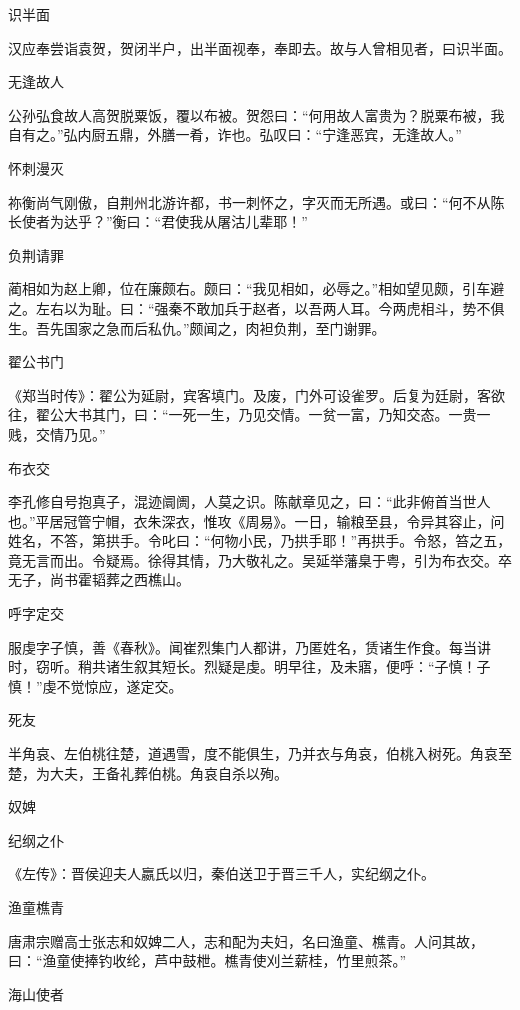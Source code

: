 \documentclass[a4paper,12pt,UTF8,twoside]{ctexbook}
\begin{document}
    识半面
    
    汉应奉尝诣袁贺，贺闭半户，出半面视奉，奉即去。故与人曾相见者，曰识半面。
    
    无逢故人
    
    公孙弘食故人高贺脱粟饭，覆以布被。贺怨曰：“何用故人富贵为？脱粟布被，我自有之。”弘内厨五鼎，外膳一肴，诈也。弘叹曰：“宁逢恶宾，无逢故人。”
    
    怀刺漫灭
    
    祢衡尚气刚傲，自荆州北游许都，书一刺怀之，字灭而无所遇。或曰：“何不从陈长使者为达乎？”衡曰：“君使我从屠沽儿辈耶！”
    
    负荆请罪
    
    蔺相如为赵上卿，位在廉颇右。颇曰：“我见相如，必辱之。”相如望见颇，引车避之。左右以为耻。曰：“强秦不敢加兵于赵者，以吾两人耳。今两虎相斗，势不俱生。吾先国家之急而后私仇。”颇闻之，肉袒负荆，至门谢罪。
    
    翟公书门
    
    《郑当时传》：翟公为延尉，宾客填门。及废，门外可设雀罗。后复为廷尉，客欲往，翟公大书其门，曰：“一死一生，乃见交情。一贫一富，乃知交态。一贵一贱，交情乃见。”
    
    布衣交
    
    李孔修自号抱真子，混迹阛阓，人莫之识。陈献章见之，曰：“此非俯首当世人也。”平居冠管宁帽，衣朱深衣，惟攻《周易》。一日，输粮至县，令异其容止，问姓名，不答，第拱手。令叱曰：“何物小民，乃拱手耶！”再拱手。令怒，笞之五，竟无言而出。令疑焉。徐得其情，乃大敬礼之。吴延举藩臬于粤，引为布衣交。卒无子，尚书霍韬葬之西樵山。
    
    呼字定交
    
    服虔字子慎，善《春秋》。闻崔烈集门人都讲，乃匿姓名，赁诸生作食。每当讲时，窃听。稍共诸生叙其短长。烈疑是虔。明早往，及未寤，便呼：“子慎！子慎！”虔不觉惊应，遂定交。
    
    死友
    
    半角哀、左伯桃往楚，道遇雪，度不能俱生，乃并衣与角哀，伯桃入树死。角哀至楚，为大夫，王备礼葬伯桃。角哀自杀以殉。
    
    奴婢
    
    纪纲之仆
    
    《左传》：晋侯迎夫人嬴氏以归，秦伯送卫于晋三千人，实纪纲之仆。
    
    渔童樵青
    
    唐肃宗赠高士张志和奴婢二人，志和配为夫妇，名曰渔童、樵青。人问其故，曰：“渔童使捧钓收纶，芦中鼓枻。樵青使刈兰薪桂，竹里煎茶。”
    
    海山使者
    
\end{document}
